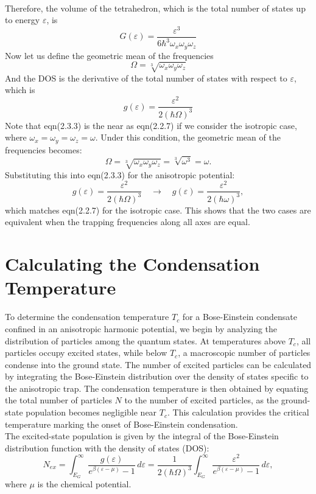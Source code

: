 \documentclass{article}
\numberwithin{equation}{section}
\numberwithin{equation}{subsection}
\begin{document}
\\
Therefore, the volume of the tetrahedron, which is the total number of states up to energy \(\varepsilon\), is
\begin{equation}
    G(\varepsilon) = \frac{\varepsilon^3}{6\hbar^3\omega_{\mathit{x}}\omega_{\mathit{y}}\omega_{\mathit{z}}}
\end{equation} 
Now let us define the geometric mean of the frequencies 
\begin{equation}
    \Omega = \sqrt[3]{\omega_{\mathit{x}}\omega_{\mathit{y}}\omega_{\mathit{z}}}
\end{equation}
And the DOS is the derivative of the total number of states with respect to \(\varepsilon\), which is
\begin{equation}
    g(\mathit{\varepsilon}) = \frac{\varepsilon^2}{2(\hbar\Omega)^3}
\end{equation} 
Note that eqn(2.3.3) is the near as eqn(2.2.7) if we consider the isotropic case, where \(\omega_{\mathit{x}} = \omega_{\mathit{y}} = \omega_{\mathit{z}} = \omega\). Under this condition, the geometric mean of the frequencies becomes:
\[
\Omega = \sqrt[3]{\omega_{\mathit{x}}\omega_{\mathit{y}}\omega_{\mathit{z}}} = \sqrt[3]{\omega^3} = \omega.
\]
Substituting this into eqn(2.3.3) for the anisotropic potential:
\[
g(\varepsilon) = \frac{\varepsilon^2}{2(\hbar \Omega)^3} \quad \longrightarrow \quad g(\varepsilon) = \frac{\varepsilon^2}{2(\hbar \omega)^3},
\]
which matches eqn(2.2.7) for the isotropic case. This shows that the two cases are equivalent when the trapping frequencies along all axes are equal.
\section{Calculating the Condensation Temperature}
To determine the condensation temperature \( T_c \) for a Bose-Einstein condensate confined in an anisotropic harmonic potential, we begin by analyzing the distribution of particles among the quantum states. At temperatures above \( T_c \), all particles occupy excited states, while below \( T_c \), a macroscopic number of particles condense into the ground state. The number of excited particles can be calculated by integrating the Bose-Einstein distribution over the density of states specific to the anisotropic trap. The condensation temperature is then obtained by equating the total number of particles \( N \) to the number of excited particles, as the ground-state population becomes negligible near \( T_c \). This calculation provides the critical temperature marking the onset of Bose-Einstein condensation.\\
The excited-state population is given by the integral of the Bose-Einstein distribution function with the density of states (DOS):
\begin{equation}
    N_{ex} = \int_{E_G}^{\infty} \frac{g(\varepsilon)}{e^{\beta (\varepsilon - \mu)} - 1} \,d\varepsilon = \frac{1}{2(\hbar\Omega)^3} \int_{E_G}^{\infty} \frac{\varepsilon^2}{e^{\beta (\varepsilon - \mu)} - 1} \,d\varepsilon,
\end{equation}
where \( \mu \) is the chemical potential.
\end{document}
